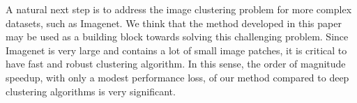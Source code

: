 \documentclass[11pt]{article}
\theoremstyle{definition}
\begin{document}
A natural next step is to address the image clustering problem for more complex datasets, such as
Imagenet. We think that the method developed in this paper may be used as a building block towards solving
this challenging problem. Since Imagenet is very large and contains a lot of small image patches, it is critical
to have fast and robust clustering algorithm. In this sense, the order of magnitude speedup, with only a modest performance loss, of our method compared to deep clustering algorithms is very significant.




\clearpage


        


\end{document}
